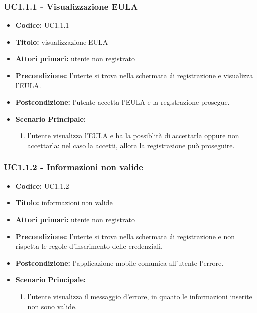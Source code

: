 \documentclass[casi-duso]{subfiles}
\begin{document}
\subsubsection{UC1.1.1 - Visualizzazione EULA}
\label{subsub:uc1.1.2utente}
\begin{itemize}
  \item \textbf{Codice:} UC1.1.1
  \item \textbf{Titolo:} visualizzazione EULA
  \item \textbf{Attori primari:} utente non registrato
  \item \textbf{Precondizione:} l'utente si trova nella schermata di registrazione e visualizza l'EULA\@.
  \item \textbf{Postcondizione:} l'utente accetta l'EULA e la registrazione prosegue.
  \item \textbf{Scenario Principale:}
  \begin{enumerate}
    \item l'utente visualizza l'EULA e ha la possiblità di accettarla oppure non accettarla: nel caso la accetti, allora la registrazione può proseguire.
  \end{enumerate}
\end{itemize}

\subsubsection{UC1.1.2 - Informazioni non valide}
\label{subsub:uc1.1.2utente}
\begin{itemize}
  \item \textbf{Codice:} UC1.1.2
  \item \textbf{Titolo:} informazioni non valide
  \item \textbf{Attori primari:} utente non registrato
  \item \textbf{Precondizione:} l'utente si trova nella schermata di registrazione e non rispetta le regole d'inserimento delle credenziali.
  \item \textbf{Postcondizione:} l'applicazione mobile comunica all'utente l'errore.
  \item \textbf{Scenario Principale:} 
  \begin{enumerate}
    \item l'utente visualizza il messaggio d'errore, in quanto le informazioni inserite non sono valide.
  \end{enumerate}
\end{itemize}
\end{document}
